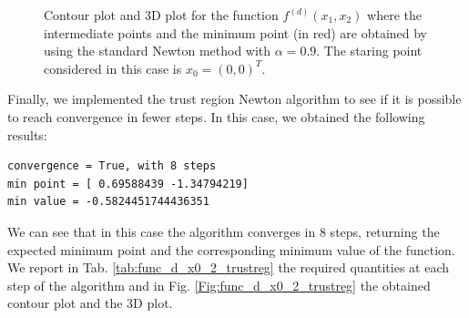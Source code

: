 \documentclass[a4paper,11pt]{article}
\begin{document}
	\begin{figure}[H]
		\centering
		 \quad
		\caption{Contour plot and 3D plot for the function $f^{(d)}(x_{1},x_{2})$ where the intermediate points and the minimum point (in red) are obtained by using the standard Newton method with $\alpha=0.9$. The staring point considered in this case is $x_{0}=(0,0)^{T}$.}
		\label{Fig:func_d}
	\end{figure}

\noindent Finally, we implemented the trust region Newton algorithm to see if it is possible to reach convergence in fewer steps. In this case, we obtained the following results:
\begin{verbatim}
convergence = True, with 8 steps
min point = [ 0.69588439 -1.34794219]
min value = -0.5824451744436351
\end{verbatim}
We can see that in this case the algorithm converges in $8$ steps, returning the expected minimum point and the corresponding minimum value of the function. We report in Tab. \ref{tab:func_d_x0_2_trustreg} the required quantities at each step of the algorithm and in Fig. \ref{Fig:func_d_x0_2_trustreg} the obtained contour plot and the 3D plot.
\end{document}
